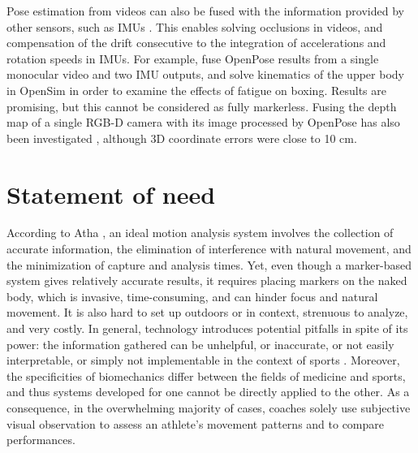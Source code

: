 Pose estimation from videos can also be fused with the information provided by other sensors, such as IMUs \cite{Bao2022, Zhang2020}. This enables solving occlusions in videos, and compensation of the drift consecutive to the integration of accelerations and rotation speeds in IMUs. For example, \cite{Haralabidis2020} fuse OpenPose results from a single monocular video and two IMU outputs, and solve kinematics of the upper body in OpenSim in order to examine the effects of fatigue on boxing. Results are promising, but this cannot be considered as fully markerless. Fusing the depth map of a single RGB-D camera with its image processed by OpenPose has also been investigated \cite{Liu2022c}, although 3D coordinate errors were close to 10 cm.

\medskip


\section{Statement of need}\label{sec:statement of need}

According to Atha \cite{Atha1984}, an ideal motion analysis system involves the collection of accurate information, the elimination of interference with natural movement, and the minimization of capture and analysis times. Yet, even though a marker-based system gives relatively accurate results, it requires placing markers on the naked body, which is invasive, time-consuming, and can hinder focus and natural movement. It is also hard to set up outdoors or in context, strenuous to analyze, and very costly. In general, technology introduces potential pitfalls in spite of its power: the information gathered can be unhelpful, or inaccurate, or not easily interpretable, or simply not implementable in the context of sports \cite{Windt2020}. Moreover, the specificities of biomechanics differ between the fields of medicine and sports, and thus systems developed for one cannot be directly applied to the other. As a consequence, in the overwhelming majority of cases, coaches solely use subjective visual observation to assess an athlete's movement patterns and to compare performances. 


